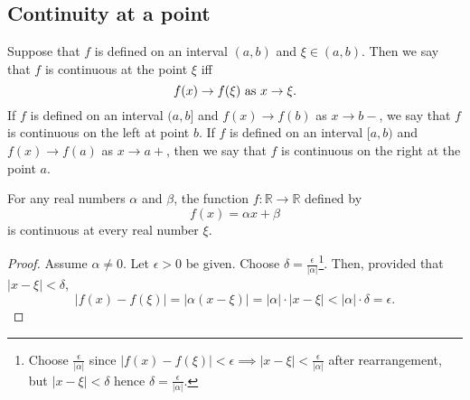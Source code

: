 \documentclass[10pt, a4paper]{article}
\newcommand{\R}{\mathbb{R}}
\begin{document}
\subsection{Continuity at a point}
Suppose that $f$ is defined on an interval $(a, b)$ and $\xi \in (a, b)$. Then we say that $f$ is continuous at the point $\xi$ iff
$$f(x) \rightarrow f(\xi) \textnormal{ as } x \rightarrow \xi.$$
If $f$ is defined on an interval $(a, b]$ and $f(x) \rightarrow f(b)$ as $x \rightarrow b-$, we say that $f$ is continuous on the left at point $b$. If $f$ is defined on an interval $[a, b)$ and $f(x) \rightarrow f(a)$ as $x \rightarrow a+$, then we say that $f$ is continuous on the right at the point $a$.

\begin{example}\label{examp_cont_monomial}
    For any real numbers $\alpha$ and $\beta$, the function $f: \R \rightarrow \R$ defined by
    $$f(x) = \alpha x + \beta$$
    is continuous at every real number $\xi$.
    \begin{proof}
        Assume $\alpha \neq 0$. Let $\epsilon > 0$ be given. Choose $\delta = \frac{\epsilon}{|\alpha|}$\footnote{Choose
        $\frac{\epsilon}{|\alpha|}$ since $|f(x) - f(\xi)| < \epsilon \implies |x - \xi| < \frac{\epsilon}{|\alpha|}$ after rearrangement, but $|x - \xi| < \delta$ hence $\delta = \frac{\epsilon}{|\alpha|}$.}. Then, provided that $|x - \xi| < \delta$,
        $$|f(x) - f(\xi)| = |\alpha(x - \xi)| = |\alpha|\cdot|x - \xi| < |\alpha|\cdot\delta = \epsilon.$$
    \end{proof}
\end{example}
\end{document}
